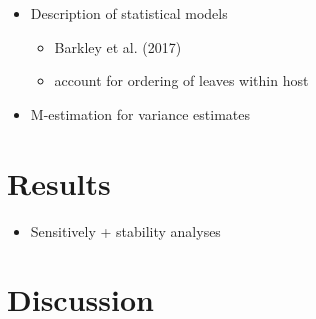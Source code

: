 \documentclass[]{article}
\providecommand{\tightlist}{%
  \setlength{\itemsep}{0pt}\setlength{\parskip}{0pt}}
\begin{document}
\begin{itemize}
\tightlist
\item
  Description of statistical models

  \begin{itemize}
  \tightlist
  \item
    Barkley et al. (2017)
  \item
    account for ordering of leaves within host
  \end{itemize}
\item
  M-estimation for variance estimates
\end{itemize}

\hypertarget{results}{%
\section{Results}\label{results}}

\begin{itemize}
\tightlist
\item
  Sensitively + stability analyses
\end{itemize}

\hypertarget{discussion}{%
\section{Discussion}\label{discussion}}
\end{document}

